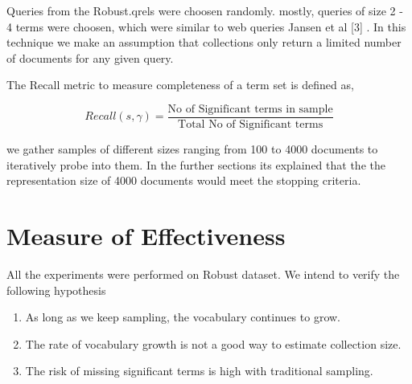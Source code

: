 \documentclass[paper=a4, fontsize=11pt,twoside]{scrartcl}	%
\begin{document}
Queries from the Robust.qrels were choosen randomly. mostly, queries of size 2 - 4 terms were choosen, which were similar to web queries  Jansen et al [3] . In this technique we make an assumption that collections only return a limited number of documents for any given query.

The Recall metric to measure completeness of a term set is defined as,

$$Recall(s,\gamma) = \frac{\text{No of Significant terms in sample}}{\text{Total No of Significant terms}}$$

we gather samples of different sizes ranging from 100 to 4000 documents to iteratively probe into them. In the further sections its explained that the the representation size of 4000 documents would meet the stopping criteria. 




%

\section{Measure of Effectiveness}

All the experiments were performed on Robust dataset. We intend to verify the following hypothesis
\begin{enumerate}
\itemsep -0.5em
\item As long as we keep sampling, the vocabulary continues to grow.
\item The rate of vocabulary growth is not a good way to estimate collection size.
\item The risk of missing significant terms is high with traditional sampling.
\end{enumerate}
\end{document}
